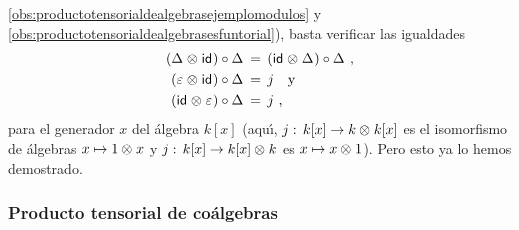 \begin{ejemploCoalgebra}
	\ref{obs:productotensorialdealgebrasejemplomodulos} y
	\ref{obs:productotensorialdealgebrasesfuntorial}), basta verificar las
	igualdades
	\begin{align*}
		(\Delta_{}\otimes_{}\mathsf{id}_{})\circ\Delta_{} & \,=\,
			(\mathsf{id}_{}\otimes_{}\Delta_{})\circ\Delta_{} \text{ ,} \\
		(\varepsilon_{}\otimes_{}\mathsf{id}_{})\circ\Delta_{} & \,=\, j
			\quad\text{y} \\
		(\mathsf{id}_{}\otimes_{}\varepsilon_{})\circ\Delta_{} & \,=\, j
		\text{ ,}
	\end{align*}
	para el generador $x$ del \'{a}lgebra $k[x]$ (aqu\'{\i},
	$j:\,k[x]\rightarrow k\otimes_{} k[x]$ es el isomorfismo de \'{a}lgebras
	$x\mapsto 1\otimes_{} x$ y $j:\,k[x]\rightarrow k[x]\otimes_{} k$ es
	$x\mapsto x\otimes_{} 1$). Pero esto ya lo hemos demostrado.
\end{ejemploCoalgebra}

\subsubsection{Producto tensorial de co\'{a}lgebras}

